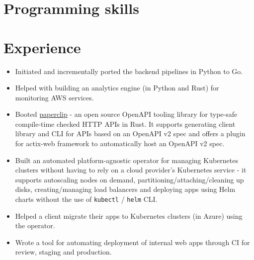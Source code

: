 \documentclass[11pt,a4paper,sans]{moderncv}        %
\newcommand\chref[3][linky]{\href{#2}{\color{#1}#3}}
\begin{document}


\vspace*{-1.8\baselineskip}
\makecvtitle
\vspace{-1.75\baselineskip}


\section{Programming skills}

\section{Experience}
{\begin{itemize}
		\item Initiated and incrementally ported the backend pipelines in Python to Go.
		\item Helped with building an analytics engine (in Python and Rust) for monitoring AWS services.
		\item Booted \chref{https://github.com/wafflespeanut/paperclip}{paperclip} - an open source OpenAPI tooling library for type-safe compile-time checked HTTP APIs in Rust. It supports generating client library and CLI for APIs based on an OpenAPI v2 spec and offers a plugin for actix-web framework to automatically host an OpenAPI v2 spec.
	\end{itemize}}

{\begin{itemize}
		\item Built an automated platform-agnostic operator for managing Kubernetes clusters without having to rely on a cloud provider's Kubernetes service - it supports autoscaling nodes on demand, partitioning/attaching/cleaning up disks, creating/managing load balancers and deploying apps using Helm charts without the use of \texttt{kubectl} / \texttt{helm} CLI.
		\item Helped a client migrate their apps to Kubernetes clusters (in Azure) using the operator.
		\item Wrote a tool for automating deployment of internal web apps through CI for review, staging and production.
	\end{itemize}}
\end{document}
